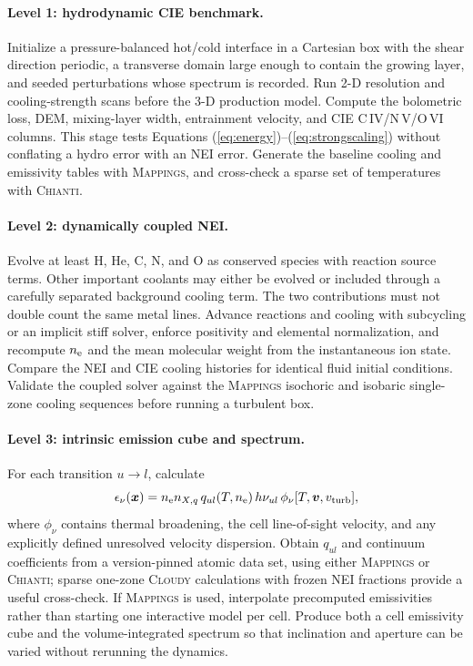 \documentclass[english,a4paper]{my_memo2}
\newcommand{\nelec}{n_{\rm e}}
\begin{document}
\paragraph{Level 1: hydrodynamic CIE benchmark.}
Initialize a pressure-balanced hot/cold interface in a Cartesian box with the
shear direction periodic, a transverse domain large enough to contain the
growing layer, and seeded perturbations whose spectrum is recorded.  Run 2-D
resolution and cooling-strength scans before the 3-D production model.
Compute the bolometric loss, DEM, mixing-layer width, entrainment velocity,
and CIE C\,IV/N\,V/O\,VI columns.  This stage tests Equations
(\ref{eq:energy})--(\ref{eq:strongscaling}) without conflating a hydro error
with an NEI error.  Generate the baseline cooling and emissivity tables with
\textsc{Mappings}, and cross-check a sparse set of temperatures with
\textsc{Chianti}.

\paragraph{Level 2: dynamically coupled NEI.}
Evolve at least H, He, C, N, and O as conserved species with reaction source
terms.  Other important coolants may either be evolved or included through a
carefully separated background cooling term.  The two contributions must not
double count the same metal lines.  Advance reactions and cooling with
subcycling or an implicit stiff solver, enforce positivity and elemental
normalization, and recompute $\nelec$ and the mean molecular weight from the
instantaneous ion state.  Compare the NEI and CIE cooling histories for
identical fluid initial conditions.  Validate the coupled solver against the
\textsc{Mappings} isochoric and isobaric single-zone cooling sequences before
running a turbulent box.

\paragraph{Level 3: intrinsic emission cube and spectrum.}
For each transition $u\rightarrow l$, calculate
\begin{equation}
 \epsilon_\nu(\boldsymbol{x})=
 \nelec n_{X,q}\,q_{ul}(T,\nelec)\,h\nu_{ul}\,
 \phi_\nu[T,\boldsymbol{v},v_{\rm turb}],
 \label{eq:profileem}
\end{equation}
where $\phi_\nu$ contains thermal broadening, the cell line-of-sight velocity,
and any explicitly defined unresolved velocity dispersion.  Obtain
$q_{ul}$ and continuum coefficients from a version-pinned atomic data set,
using either \textsc{Mappings} or \textsc{Chianti}; sparse one-zone
\textsc{Cloudy} calculations with frozen NEI fractions provide a useful
cross-check.  If \textsc{Mappings} is used, interpolate precomputed
emissivities rather than starting one interactive model per cell.  Produce
both a cell emissivity cube and the volume-integrated spectrum so that
inclination and aperture can be varied without rerunning the dynamics.
\end{document}
